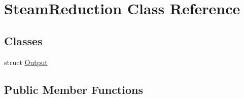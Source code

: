 \hypertarget{class_steam_reduction}{}\section{Steam\+Reduction Class Reference}
\label{class_steam_reduction}
\subsection*{Classes}
\begin{DoxyCompactItemize}
\item 
struct \hyperlink{struct_steam_reduction_1_1_output}{Output}
\end{DoxyCompactItemize}
\subsection*{Public Member Functions}
